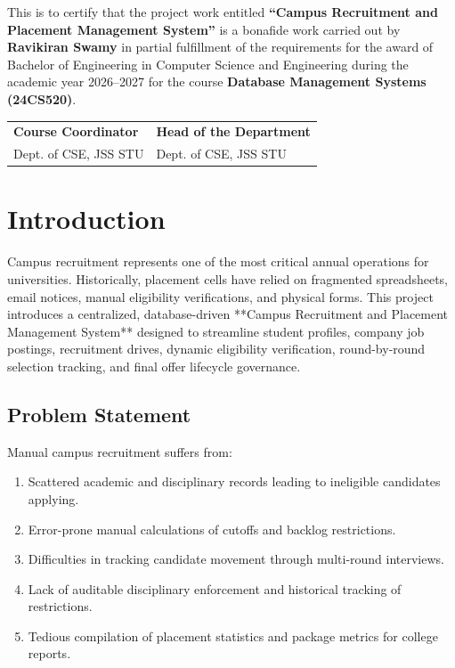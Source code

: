 \documentclass[12pt,a4paper]{report}
\begin{document}
\noindent This is to certify that the project work entitled \textbf{``Campus Recruitment and Placement Management System''} is a bonafide work carried out by \textbf{Ravikiran Swamy} in partial fulfillment of the requirements for the award of Bachelor of Engineering in Computer Science and Engineering during the academic year 2026--2027 for the course \textbf{Database Management Systems (24CS520)}.

\vspace{3.5cm}

\noindent
\begin{tabular}{@{}p{}p{}@{}}
    \textbf{Course Coordinator} & \textbf{Head of the Department} \\
    Dept. of CSE, JSS STU & Dept. of CSE, JSS STU
\end{tabular}

\newpage
{}
\tableofcontents
\newpage


\chapter{Introduction}
Campus recruitment represents one of the most critical annual operations for universities. Historically, placement cells have relied on fragmented spreadsheets, email notices, manual eligibility verifications, and physical forms. This project introduces a centralized, database-driven **Campus Recruitment and Placement Management System** designed to streamline student profiles, company job postings, recruitment drives, dynamic eligibility verification, round-by-round selection tracking, and final offer lifecycle governance.

\section{Problem Statement}
Manual campus recruitment suffers from:
\begin{enumerate}
    \item Scattered academic and disciplinary records leading to ineligible candidates applying.
    \item Error-prone manual calculations of cutoffs and backlog restrictions.
    \item Difficulties in tracking candidate movement through multi-round interviews.
    \item Lack of auditable disciplinary enforcement and historical tracking of restrictions.
    \item Tedious compilation of placement statistics and package metrics for college reports.
\end{enumerate}
\end{document}
